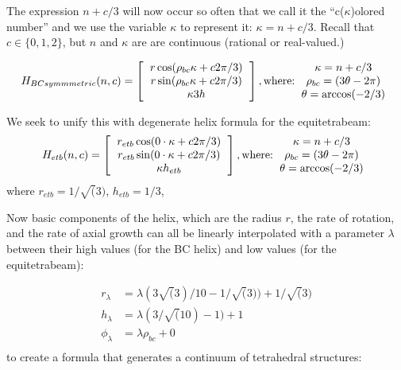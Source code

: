 \documentclass[11pt]{article}
\begin{document}
The expression $n+c/3$ will now occur so often that we call it the ``c($\kappa$)olored number'' and we use the variable $\kappa$ to represent it: $\kappa = n+c/3$.
Recall that $c \in \{0,1,2\}$, but $n$ and $\kappa$ are are continuous (rational or real-valued.)

\[
H_{BCsymmmetric}(n,c) =
\left [
  \begin{tabular}{c}
   $ r  \cos(\rho_{bc} \kappa  + c 2 \pi /3) $\\
   $ r  \sin(\rho_{bc} \kappa  + c 2 \pi /3) $\\
   $ \kappa 3  h $
  \end{tabular}
  \right ],
\text{where:}
  \begin{tabular}{c}
 $\kappa = n + c/3$ \\
    $\rho_{bc} = (3 \theta - 2 \pi)$ \\
   $ \theta = \arccos(-2/3) $
  \end{tabular}      
\]

We seek to unify this with degenerate helix formula for the equitetrabeam:
\[
H_{etb}(n,c) =
\left [
  \begin{tabular}{c}
   $ r_{etb}  \cos( 0 \cdot \kappa  + c 2 \pi /3) $\\
   $ r_{etb}  \sin( 0 \cdot \kappa  + c 2 \pi /3) $\\
   $ \kappa h_{etb} $
  \end{tabular}
\right ],
\text{where:}
  \begin{tabular}{c}
 $\kappa = n + c/3$ \\
    $\rho_{bc} = (3 \theta - 2 \pi)$ \\
   $ \theta = \arccos(-2/3) $
  \end{tabular}      
\]
where $ r_{etb} = 1/\sqrt(3)$, $h_{etb} = 1/3$,

Now basic components of the helix, which are the radius $r$, the rate of rotation, and the rate of
axial growth can all be linearly interpolated with a parameter $\lambda$ between their high values (for the BC helix)
and low values (for the equitetrabeam):

\begin{align*}
r_{\lambda}  &=  \lambda (3 \sqrt(3) / 10 - 1/\sqrt(3)) +  1/\sqrt(3) \\
h_{\lambda} &=   \lambda (3 / \sqrt(10) - 1)+ 1 \\
\phi_{\lambda} &=  \lambda \rho_{bc}  + 0\\
\end{align*}
to create a formula that generates a continuum of tetrahedral structures:
\end{document}
